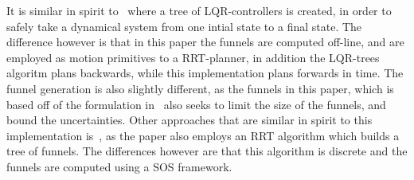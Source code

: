 It is similar in spirit to~\cite{tedrakeLQRtreesFeedbackMotion2009} where a tree
of \ac{LQR}-controllers is created, in order to safely take a dynamical system
from one intial state to a final state. The difference however is that in this
paper the funnels are computed off-line, and are employed as motion primitives
to a \ac{RRT}-planner, in addition the \ac{LQR}-trees algoritm plans backwards,
while this implementation plans forwards in time. The funnel generation is also
slightly different, as the funnels in this paper, which is based off of the
formulation in~\cite{majumdarFunnelLibrariesRealtime2017} also seeks to limit
the size of the funnels, and bound the uncertainties. Other approaches that are
similar in spirit to this implementation
is~\cite{lenySequentialCompositionRobust2012}, as the paper also employs an
\ac{RRT} algorithm which builds a tree of funnels. The differences however are
that this algorithm is discrete and the funnels are computed using a \ac{SOS}
framework.

